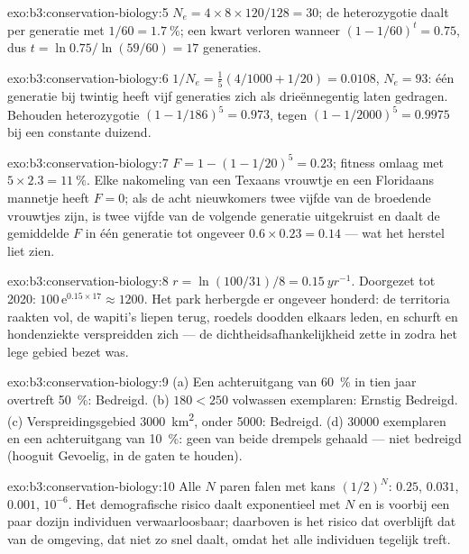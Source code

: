 \begin{solution}{exo:b3:conservation-biology:5}
$N_{e} = 4\times 8\times 120/128 = 30$; de heterozygotie daalt per
generatie met $1/60 =
\qty{1.7}{\%}$; een kwart verloren wanneer $(1 - 1/60)^{t} =
0.75$, dus $t = \ln 0.75/\ln(59/60) = 17$ generaties.
\end{solution}

\begin{solution}{exo:b3:conservation-biology:6}
$1/N_{e} = \tfrac{1}{5}(4/1000 + 1/20) = 0.0108$, $N_{e} = 93$: één
generatie bij twintig heeft vijf generaties zich als drieënnegentig
laten gedragen. Behouden heterozygotie $(1 - 1/186)^{5} = 0.973$, tegen
$(1 -
1/2000)^{5} = 0.9975$ bij een constante duizend.
\end{solution}

\begin{solution}{exo:b3:conservation-biology:7}
$F = 1 - (1 - 1/20)^{5} = 0.23$; fitness omlaag met $5\times 2.3 = \qty{11}{\%}$.
Elke nakomeling van een Texaans vrouwtje en een Floridaans mannetje
heeft $F = 0$; als de acht nieuwkomers twee vijfde van de broedende
vrouwtjes zijn, is twee vijfde van de volgende generatie uitgekruist en
daalt de gemiddelde $F$ in één generatie tot ongeveer
$0.6\times 0.23 = 0.14$ --- wat het herstel liet zien.
\end{solution}

\begin{solution}{exo:b3:conservation-biology:8}
$r = \ln(100/31)/8 = \qty{0.15}{yr^{-1}}$. Doorgezet tot 2020:
$100\,\mathrm{e}^{0.15\times 17} \approx 1200$. Het park herbergde er
ongeveer honderd: de territoria raakten vol, de wapiti's liepen terug,
roedels doodden elkaars leden, en schurft en hondenziekte verspreidden
zich --- de dichtheidsafhankelijkheid zette in zodra het lege gebied
bezet was.
\end{solution}

\begin{solution}{exo:b3:conservation-biology:9}
(a) Een achteruitgang van \qty{60}{\%} in tien jaar overtreft
\qty{50}{\%}: Bedreigd. (b) $180 < 250$ volwassen exemplaren: Ernstig
Bedreigd. (c) Verspreidingsgebied \qty{3000}{km^2}, onder \qty{5000}{}:
Bedreigd. (d) \num{30000} exemplaren en een achteruitgang van
\qty{10}{\%}: geen van beide drempels gehaald --- niet bedreigd
(hooguit Gevoelig, in de gaten te houden).
\end{solution}

\begin{solution}{exo:b3:conservation-biology:10}
Alle $N$ paren falen met kans $(1/2)^{N}$: $0.25$, $0.031$, $0.001$,
$10^{-6}$. Het demografische risico daalt exponentieel met $N$ en is
voorbij een paar dozijn individuen verwaarloosbaar; daarboven is het
risico dat overblijft dat van de omgeving, dat niet zo snel daalt,
omdat het alle individuen tegelijk treft.
\end{solution}

